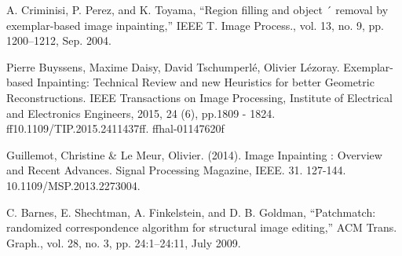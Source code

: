 \documentclass[conference]{IEEEtran}
\begin{document}
\begin{thebibliography}{00}
 A. Criminisi, P. Perez, and K. Toyama, “Region filling and object ´
removal by exemplar-based image inpainting,” IEEE T. Image Process.,
vol. 13, no. 9, pp. 1200–1212, Sep. 2004.

 Pierre Buyssens, Maxime Daisy, David Tschumperlé, Olivier Lézoray. Exemplar-based Inpainting:
Technical Review and new Heuristics for better Geometric Reconstructions. IEEE Transactions on
Image Processing, Institute of Electrical and Electronics Engineers, 2015, 24 (6), pp.1809 - 1824.
ff10.1109/TIP.2015.2411437ff. ffhal-01147620f

 Guillemot, Christine \& Le Meur, Olivier. (2014). Image Inpainting : Overview and Recent Advances. Signal Processing Magazine, IEEE. 31. 127-144. 10.1109/MSP.2013.2273004. 

 C. Barnes, E. Shechtman, A. Finkelstein, and D. B. Goldman, ``Patchmatch: randomized correspondence algorithm for structural image editing,'' ACM Trans. Graph., vol. 28, no. 3, pp. 24:1–24:11, July 2009.

\end{thebibliography}
\end{document}
